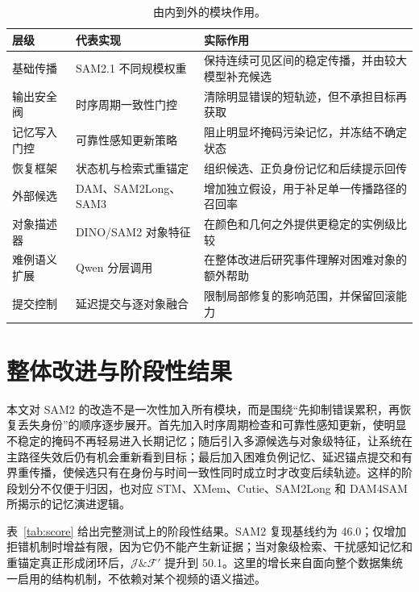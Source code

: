 \documentclass[11pt,a4paper,oneside]{ctexart}
\newcommand{\jf}{\ensuremath{\mathcal{J}\!\&\!\mathcal{F}'}}
\begin{document}
\begin{table}[H]
\centering
\caption{由内到外的模块作用。}
\label{tab:modules}
\small
\renewcommand{\arraystretch}{1.16}
\begin{tabularx}{\textwidth}{>{\raggedright\arraybackslash}p{2.15cm} >{\raggedright\arraybackslash}p{4.0cm} >{\raggedright\arraybackslash}X}
\toprule
层级 & 代表实现 & 实际作用 \\
\midrule
基础传播 & SAM2.1 不同规模权重 & 保持连续可见区间的稳定传播，并由较大模型补充候选 \\
输出安全阀 & 时序周期一致性门控 & 清除明显错误的短轨迹，但不承担目标再获取 \\
记忆写入门控 & 可靠性感知更新策略 & 阻止明显坏掩码污染记忆，并冻结不确定状态 \\
恢复框架 & 状态机与检索式重锚定 & 组织候选、正负身份记忆和后续提示回传 \\
外部候选 & DAM、SAM2Long、SAM3 & 增加独立假设，用于补足单一传播路径的召回率 \\
对象描述器 & DINO/SAM2 对象特征 & 在颜色和几何之外提供更稳定的实例级比较 \\
难例语义扩展 & Qwen 分层调用 & 在整体改进后研究事件理解对困难对象的额外帮助 \\
提交控制 & 延迟提交与逐对象融合 & 限制局部修复的影响范围，并保留回滚能力 \\
\bottomrule
\end{tabularx}
\end{table}

\section{整体改进与阶段性结果}

本文对 SAM2 的改造不是一次性加入所有模块，而是围绕“先抑制错误累积，再恢复丢失身份”的顺序逐步展开。首先加入时序周期检查和可靠性感知更新，使明显不稳定的掩码不再轻易进入长期记忆；随后引入多源候选与对象级特征，让系统在主路径失效后仍有机会重新看到目标；最后加入困难负例记忆、延迟锚点提交和有界重传播，使候选只有在身份与时间一致性同时成立时才改变后续轨迹。这样的阶段划分不仅便于归因，也对应 STM、XMem、Cutie、SAM2Long 和 DAM4SAM 所揭示的记忆演进逻辑。

表~\ref{tab:score} 给出完整测试上的阶段性结果。SAM2 复现基线约为 46.0；仅增加拒错机制时增益有限，因为它仍不能产生新证据；当对象级检索、干扰感知记忆和重锚定真正形成闭环后，\jf{} 提升到 50.1。这里的增长来自面向整个数据集统一启用的结构机制，不依赖对某个视频的语义描述。
\end{document}
